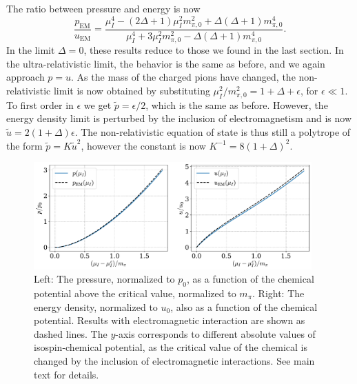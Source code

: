 %
The ratio between pressure and energy is now
%
\begin{equation}
    \frac{p_\text{EM}}{u_\text{EM}} 
    = 
    \frac{
        {\mu_I^4} - (2\Delta + 1) {\mu_I^2}{m_{\pi,0}^2} + \Delta(\Delta + 1)m_{\pi,0}^4
        }{
        {\mu_I^4} + 3 {\mu_I^2}{m_{\pi,0}^2} - \Delta (\Delta +1) m_{\pi,0}^4
        }.
\end{equation}
%
In the limit $\Delta = 0$, these results reduce to those we found in the last section.
In the ultra-relativistic limit, the behavior is the same as before, and we again approach $p = u$.
As the mass of the charged pions have changed, the non-relativistic limit is now obtained by substituting ${\mu_I^2}/{m_{\pi,0}^2} = 1 + \Delta + \epsilon$, for $\epsilon \ll 1$.
To first order in $\epsilon$ we get $\tilde p = \epsilon / 2$, which is the same as before.
However, the energy density limit is perturbed by the inclusion of electromagnetism and is now $\tilde u = 2(1 + \Delta) \epsilon$.
The non-relativistic equation of state is thus still a polytrope of the form $\tilde p = K \tilde u^2$, however the constant is now $K^{-1} = 8 (1+\Delta)^2$.


\begin{figure}[!htb]
    \centering
    \includegraphics[width=0.95\textwidth]{../scripts/figurer/pion_star/pion_up.pdf}
    \caption{
        Left: The pressure, normalized to $p_0$, as a function of the chemical potential above the critical value, normalized to $m_{\pi}$.
        Right: The energy density, normalized to $u_0$, also as a function of the chemical potential.
        Results with electromagnetic interaction are shown as dashed lines.
        The $y$-axis corresponds to different absolute values of isospin-chemical potential, as the critical value of the chemical is changed by the inclusion of electromagnetic interactions. See main text for details.
        }
        \label{fig: pressure and energy with EM interaction}
\end{figure}



